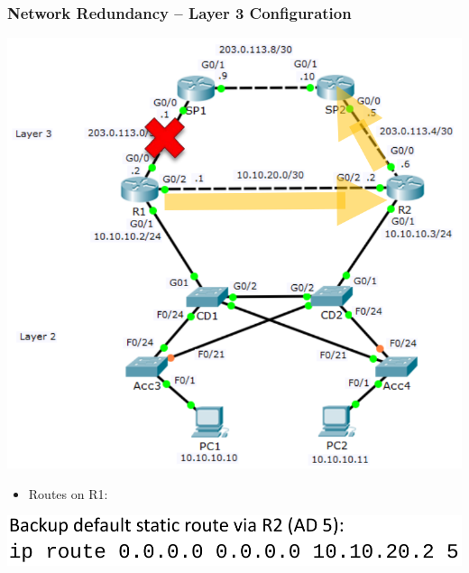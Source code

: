 \documentclass[pdflatex,compress,mathserif]{beamer}
\begin{document}
\begin{frame}
	\frametitle{Network Redundancy – Layer 3 Configuration}
	\begin{multicols}{2}
		\begin{center}
			\includegraphics[width=\linewidth]{img/img04}
		\end{center}
		\columnbreak
		\begin{itemize}
			\item Routes on R1:
		\end{itemize}
		\begin{center}
			\includegraphics[width=\linewidth]{img/img05}
		\end{center}
	\end{multicols}
\end{frame}
\end{document}
